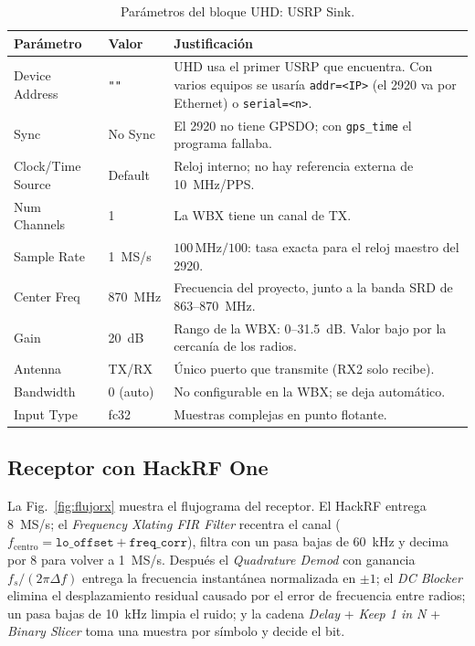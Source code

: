 \documentclass[conference]{IEEEtran}
\begin{document}
\begin{table}[!t]
\centering
\caption{Parámetros del bloque UHD: USRP Sink.}
\label{tab:uhd}
\begin{tabular}{>{\raggedright}p{1.9cm}>{\raggedright}p{1.5cm}p{4.1cm}}
\toprule
Parámetro & Valor & Justificación \\
\midrule
Device Address & \texttt{""} & UHD usa el primer USRP que encuentra. Con varios equipos se usaría \texttt{addr=<IP>} (el 2920 va por Ethernet) o \texttt{serial=<n>}. \\
Sync & No Sync & El 2920 no tiene GPSDO; con \texttt{gps\_time} el programa fallaba. \\
Clock/Time Source & Default & Reloj interno; no hay referencia externa de 10~MHz/PPS. \\
Num Channels & 1 & La WBX tiene un canal de TX. \\
Sample Rate & 1~MS/s & $100\,\text{MHz}/100$: tasa exacta para el reloj maestro del 2920. \\
Center Freq & 870~MHz & Frecuencia del proyecto, junto a la banda SRD de 863--870~MHz. \\
Gain & 20~dB & Rango de la WBX: 0--31.5~dB. Valor bajo por la cercanía de los radios. \\
Antenna & TX/RX & Único puerto que transmite (RX2 solo recibe). \\
Bandwidth & 0 (auto) & No configurable en la WBX; se deja automático. \\
Input Type & fc32 & Muestras complejas en punto flotante. \\
\bottomrule
\end{tabular}
\end{table}

\subsection{Receptor con HackRF One}

La Fig.~\ref{fig:flujorx} muestra el flujograma del receptor. El HackRF entrega 8~MS/s; el \textit{Frequency Xlating FIR Filter} recentra el canal ($f_{\text{centro}} = \texttt{lo\_offset} + \texttt{freq\_corr}$), filtra con un pasa bajas de 60~kHz y decima por 8 para volver a 1~MS/s. Después el \textit{Quadrature Demod} con ganancia $f_s/(2\pi\Delta f)$ entrega la frecuencia instantánea normalizada en $\pm 1$; el \textit{DC Blocker} elimina el desplazamiento residual causado por el error de frecuencia entre radios; un pasa bajas de 10~kHz limpia el ruido; y la cadena \textit{Delay} + \textit{Keep 1 in N} + \textit{Binary Slicer} toma una muestra por símbolo y decide el bit.
\end{document}
